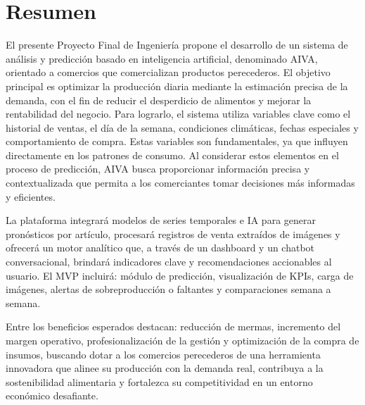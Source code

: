 \chapter*{Resumen}
    El presente Proyecto Final de Ingeniería propone el desarrollo de un sistema de análisis y predicción basado en inteligencia artificial, denominado AIVA, orientado a comercios que comercializan productos perecederos. El objetivo principal es optimizar la producción diaria mediante la estimación precisa de la demanda, con el fin de reducir el desperdicio de alimentos y mejorar la rentabilidad del negocio. Para lograrlo, el sistema utiliza variables clave como el historial de ventas, el día de la semana, condiciones climáticas, fechas especiales y comportamiento de compra. Estas variables son fundamentales, ya que influyen directamente en los patrones de consumo. Al considerar estos elementos en el proceso de predicción, AIVA busca proporcionar información precisa y contextualizada que permita a los comerciantes tomar decisiones más informadas y eficientes.
    
    La plataforma integrará modelos de series temporales e IA para generar pronósticos por artículo, procesará registros de venta extraídos de imágenes y ofrecerá un motor analítico que, a través de un dashboard y un chatbot conversacional, brindará indicadores clave y recomendaciones accionables al usuario. El MVP incluirá: módulo de predicción, visualización de KPIs, carga de imágenes, alertas de sobreproducción o faltantes y comparaciones semana a semana.

    Entre los beneficios esperados destacan: reducción de mermas, incremento del margen operativo, profesionalización de la gestión y optimización de la compra de insumos, buscando dotar a los comercios perecederos de una herramienta innovadora que alinee su producción con la demanda real, contribuya a la sostenibilidad alimentaria y fortalezca su competitividad en un entorno económico desafiante. 


